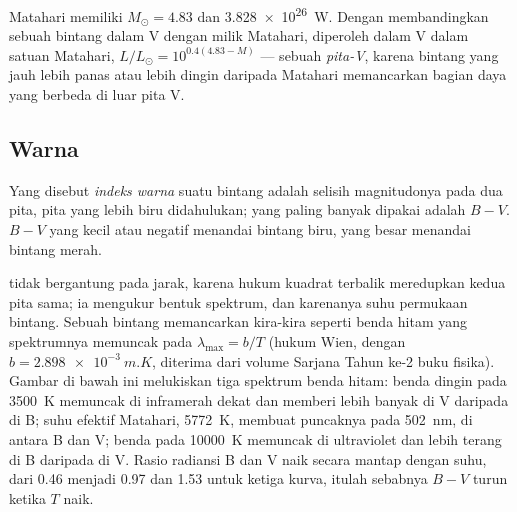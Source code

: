 Matahari memiliki  $M_\odot = 4.83$ dan  \qty{3.828e26}{W}. Dengan membandingkan  sebuah bintang dalam V dengan milik Matahari, diperoleh  dalam V dalam satuan Matahari, $L/L_\odot = 10^{0.4(4.83 - M)}$ --- sebuah  \emph{pita-V}, karena bintang yang jauh lebih panas atau lebih dingin daripada Matahari memancarkan bagian daya yang berbeda di luar pita V.

\subsection*{Warna}

\begin{definition}\label{def:b1:observing-the-sky:colour-index}
Yang disebut \emph{indeks warna} suatu bintang adalah selisih magnitudonya pada dua pita, pita yang lebih biru didahulukan; yang paling banyak dipakai adalah $B - V$. $B - V$ yang kecil atau negatif menandai bintang biru, yang besar menandai bintang merah.
\end{definition}

 tidak bergantung pada jarak, karena hukum kuadrat terbalik meredupkan kedua pita sama; ia mengukur bentuk spektrum, dan karenanya suhu permukaan bintang. Sebuah bintang memancarkan kira-kira seperti benda hitam yang spektrumnya memuncak pada $\lambda_\mathrm{max} = b/T$ (hukum Wien, dengan
$b = \qty{2.898e-3}{m.K}$, diterima dari volume Sarjana Tahun ke-2 buku fisika).
Gambar di bawah ini melukiskan tiga spektrum benda hitam: benda dingin pada \qty{3500}{K} memuncak di inframerah dekat dan memberi lebih banyak  di V daripada di B; suhu efektif Matahari, \qty{5772}{K}, membuat puncaknya pada \qty{502}{nm}, di antara B dan V; benda pada \qty{10000}{K} memuncak di ultraviolet dan lebih terang di B daripada di V. Rasio radiansi B dan V naik secara mantap dengan suhu, dari \num{0.46} menjadi \num{0.97} dan \num{1.53} untuk ketiga kurva, itulah sebabnya $B - V$ turun ketika $T$ naik.

